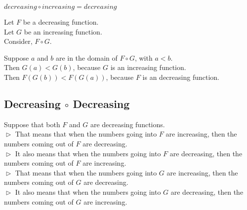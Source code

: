 \documentclass{ximera}
\begin{document}
\begin{fact}
$decreasing \circ increasing = decreasing$


Let $F$ be a decreasing function. \\
Let $G$ be an increasing function. \\


Consider, $F \circ G$.

Suppose $a$ and $b$ are in the domain of $F \circ G$, with $a < b$. \\

Then $G(a) < G(b)$, because $G$ is an increasing function. \\

Then $F(G(b)) < F(G(a))$, because $F$ is an decreasing function.


\end{fact}






















\subsection*{Decreasing $\circ$ Decreasing}


Suppose that both $F$ and $G$ are decreasing functions. \\

$\vartriangleright$ That means that when the numbers going into $F$ are increasing, then the numbers coming out of $F$ are decreasing. \\


$\vartriangleright$ It also means that when the numbers going into $F$ are decreasing, then the numbers coming out of $F$ are increasing. \\


$\vartriangleright$ That means that when the numbers going into $G$ are increasing, then the numbers coming out of $G$ are decreasing. \\



$\vartriangleright$ It also means that when the numbers going into $G$ are decreasing, then the numbers coming out of $G$ are increasing. \\
\end{document}
